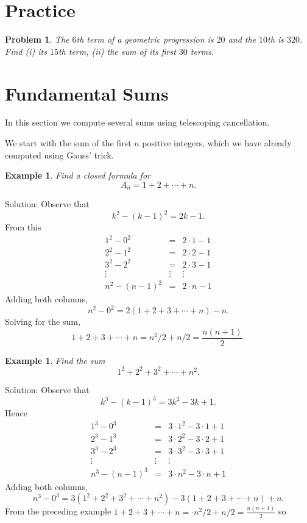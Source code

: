 \documentclass[11pt, openany]{book}
\theoremstyle{change} \theoremheaderfont{\blue\sffamily\bfseries}
\newtheorem{exa}[thm]{Example}
\newtheorem{pro}[thm]{Problem}
\theoremstyle{nonumberplain} \theoremheaderfont{\sffamily\bfseries}
\newcommand{\í}{\'{\i}}
\begin{document}
\section*{Practice}\begin{multicols}{2}\columnseprule 1pt \columnsep 25pt

\begin{pro}
The $6$th term of a geometric progression is $20$ and the $10$th
is $320$. Find (i) its $15$th term, (ii) the sum of its first $30$
terms.
\end{pro}
\end{multicols}
\section{Fundamental Sums}

In this section we compute several sums using telescoping
cancellation.


We start with the sum of the first $n$ positive integers, which we
have already computed using Gauss' trick.

\begin{exa} Find a closed formula for $$A_n = 1 + 2 + \cdots + n.$$
\end{exa}
Solution: Observe that
$$ k^2 - (k - 1)^2 = 2k - 1.$$
From this
$$
\begin{array}{lcl}
1^2 - 0^2 & = & 2\cdot 1 - 1 \\
2^2 - 1^2 & = & 2\cdot 2 - 1 \\
3^2 - 2^2 & = & 2\cdot 3 - 1 \\

\vdots & \vdots & \vdots \\
n^2 - (n - 1)^2 & = & 2\cdot n - 1
\end{array}
$$
Adding both columns,
$$n^2 - 0^2 = 2(1 + 2 + 3 + \cdots  + n) - n.$$
Solving for the sum,
$$1 + 2 + 3 + \cdots + n =  n^2/2 +  {n}/{2} = \frac{n(n + 1)}{2}.$$



\begin{exa} Find the sum
$$1^2 + 2^2 + 3^2 + \cdots + n^2.$$ \end{exa}
Solution: Observe that
$$ k^3 - (k - 1)^3 = 3k^2 - 3k + 1.$$
Hence
$$
\begin{array}{lcl}
1^3 - 0^3 & = & 3\cdot 1^2 - 3\cdot 1 + 1 \\
2^3 - 1^3 & = & 3\cdot 2^2 - 3\cdot 2 + 1 \\
3^3 - 2^3 & = & 3\cdot 3^2 - 3\cdot 3 + 1 \\
\vdots & \vdots & \vdots \\
n^3 - (n - 1)^3 & = & 3\cdot n^2 - 3\cdot n + 1
\end{array}
$$
Adding both columns,
$$n^3 - 0^3 = 3(1^2 + 2^2 + 3^2 + \cdots  + n^2) - 3(1 + 2 + 3 + \cdots + n) + n.$$
From the preceding example $1 + 2 + 3 + \cdots + n = \cdot n^2/2 +
{n}/{2} = \frac{n(n + 1)}{2}$ so
\end{document}
